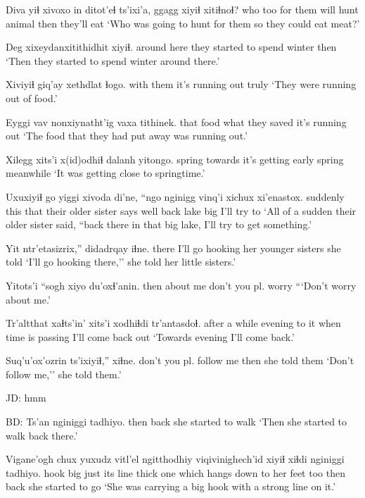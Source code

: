 \documentclass[12pt]{article}
\begin{document}
\gll Diva    yiɬ xivoxo {in ditot'eɬ} ts'ixi'a, ggagg xiyiɬ xitiɬnoɬ? 
who too {for them} {will hunt} {} animal then {they'll eat}
\glt `Who was going to hunt for them so they could eat meat?'
\glend

\gll Deg xixeydanxitithidhit xiyiɬ.
{around here} {they started to spend winter} then
\glt `Then they started to spend winter around there.'
\glend
 
\gll Xiviyiɬ {giq'ay xethdlat} ɬogo. 
{with them} {it's running out} truly
\glt `They were running out of food.'
\glend

\gll Eyggi vav nonxiynatht'ig {vaxa tithinek.} 
that  food {what they saved} {it's running out}
\glt `The food that they had put away was running out.'
\glend

\gll Xilegg xits'i x(id)odhiɬ dalanh yitongo.
spring towards {it's getting} {early spring} meanwhile
\glt `It was getting close to springtime.'
\glend

\gll Uxuxiyiɬ go yiggi xivoda di'ne, ``ngo nginigg vinq'i xichux  xi'enastox.
suddenly this that {their older sister} says well back lake big {I'll try to}
\glt `All of a sudden their older sister said, ``back there in that big lake, I'll try to get something.'
\glend

\gll Yit ntr'etasizrix,'' didadrqay iɬne.
there {I'll go hooking} {her younger sisters} {she told}
\glt `I'll go hooking there,'' she told her little sisters.'
\glend

\gll Yitots'i ``sogh {xiyo du'oxɬ'anin}.
then     {about me} {don't you pl. worry}
\glt ```Don't worry about me.'
\glend

\gll Tr'altthat xaɬts'in' xits'i xodhiɬdi           tr'antasdoɬ.
{{after a while}}      evening   {to it} {when time is passing} {I'll come back out}
\glt `Towards evening I'll come back.'
\glend

\gll Suq'u'ox'ozrin ts'ixiyiɬ,'' xiɬne.
{don't you pl. follow me} then {she told them}
\glt `Don't follow me,'' she told them.'
\glend

JD:  hmm

BD:
\gll Ts'an nginiggi tadhiyo.
then  back    {she started to walk}
\glt `Then she started to walk back there.'
\glend

\gll Vigane'ogh chux yuxudz vitl'el  ngitthodhiy  viqivinighech'id xiyiɬ xiɬdi nginiggi tadhiyo.
hook        big  just   {its line} {thick one}  {which hangs down to her feet}   too  then  back    {she started to go} 
\glt `She was carrying a big hook with a strong line on it.'
\glend
\end{document}
